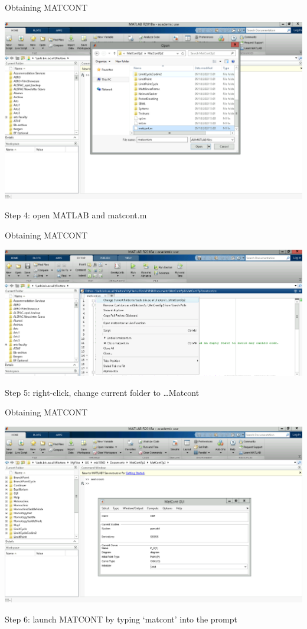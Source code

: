 \documentclass[presentation]{beamer}
\begin{document}
\begin{frame}[label={sec:org2e03c17},plain]{Obtaining MATCONT}
\begin{center}
\includegraphics[width=.9\linewidth]{./MATCONT_open.png}
\end{center}

Step 4: open MATLAB and matcont.m
\end{frame}

\begin{frame}[label={sec:orge8bb3e2},plain]{Obtaining MATCONT}
\begin{center}
\includegraphics[width=.9\linewidth]{./MATCONT_cd.png}
\end{center}

Step 5: right-click, change current folder to \ldots{}Matcont
\end{frame}

\begin{frame}[label={sec:org1fce317},plain]{Obtaining MATCONT}
\begin{center}
\includegraphics[width=.9\linewidth]{./MATCONT_launch.png}
\end{center}

Step 6: launch MATCONT by typing `matcont' into the prompt
\end{frame}
\end{document}
